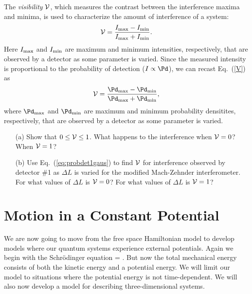 \begin{exercise}
The {\em visibility} ${\cal V}$, which measures the contrast between the interference maxima and minima, is used to characterize the amount of interference of a system:
%
\begin{equation}
{\cal V} = \frac{I_{\rm max} - I_{\rm min}}{I_{\rm max} + I_{\rm min}}.
\label{V}
\end{equation}
%
Here $I_{\rm max}$ and $I_{\rm min}$ are maximum and minimum intensities, respectively, that are observed by a detector as some parameter is varied.  Since the measured intensity is proportional to the probability of detection ($I \propto \Pd$), we can recast Eq.~(\ref{V}) as 
%
\begin{equation}
{\cal V} = \frac{\Pd_{\rm max} - \Pd_{\rm min}}{\Pd_{\rm max} + \Pd_{\rm min}},
\label{V2}
\end{equation}
%
where $\Pd_{\rm max}$ and $\Pd_{\rm min}$ are   maximum and minimum probability densitites, respectively, that are observed by a detector as some parameter is varied. 

\begin{enumerate}
\item[(a)] Show that $0 \leq {\cal V} \leq 1$.  What happens  to the interference when  ${\cal V} = 0$?  When  ${\cal V} = 1$? 
\item[(b)]  Use Eq.~(\ref{eq:probdet1gaus}) to find ${\cal V}$ for interference observed by detector \#1 as $\Delta L$ is varied for the modified Mach-Zehnder interferometer.  For what values of $\Delta L$ is  ${\cal V} = 0$?  For what values of $\Delta L$ is   ${\cal V} = 1$? 

\end{enumerate}


\end{exercise}




\chapter{Motion in a Constant Potential}

We are now going to move from the free space Hamiltonian model to develop models where our quantum systems experience external potentials. Again we begin with the Schr\"{o}dinger equation
\beq
\I\hbar{}\ket{\Psi} = \ket{\Psi}.
\eeq\marginnote[-.8cm]{\ref{tool:sch}}%
But now the total mechanical energy consists of both the kinetic energy and a potential energy. We will limit our model to situations where the potential energy is not time-dependent. We will also now develop a model for describing three-dimensional systems.

